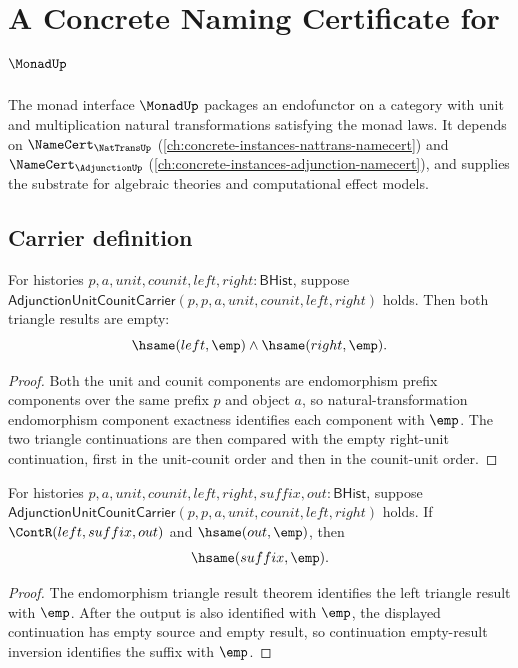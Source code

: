 \chapter{A Concrete Naming Certificate for $\MonadUp$}
\label{ch:concrete-instances-monad-namecert}

The monad interface $\MonadUp$ packages an endofunctor on a category with unit and multiplication natural transformations satisfying the monad laws. It depends on $\NameCert_{\NatTransUp}$ (\autoref{ch:concrete-instances-nattrans-namecert}) and $\NameCert_{\AdjunctionUp}$ (\autoref{ch:concrete-instances-adjunction-namecert}), and supplies the substrate for algebraic theories and computational effect models.

\section{Carrier definition}
\label{sec:monad-carrier}

\begin{theorem}
\label{thm:monad-adjunction-endomorphism-triangle-results-empty}
For histories $p,a,unit,counit,left,right:\mathsf{BHist}$, suppose
$\mathsf{AdjunctionUnitCounitCarrier}(p,p,a,unit,counit,left,right)$ holds.
Then both triangle results are empty:
$$
\hsame(left,\emp)\land\hsame(right,\emp).
$$
\end{theorem}
\begin{proof}
Both the unit and counit components are endomorphism prefix components over
the same prefix $p$ and object $a$, so natural-transformation endomorphism
component exactness identifies each component with $\emp$. The two triangle
continuations are then compared with the empty right-unit continuation, first
in the unit-counit order and then in the counit-unit order.
\end{proof}

\begin{theorem}
\label{thm:monad-adjunction-left-triangle-result-empty-suffix-empty}
For histories $p,a,unit,counit,left,right,suffix,out:\mathsf{BHist}$, suppose
$\mathsf{AdjunctionUnitCounitCarrier}(p,p,a,unit,counit,left,right)$ holds. If
$\ContR(left,suffix,out)$ and $\hsame(out,\emp)$, then
$$
\hsame(suffix,\emp).
$$
\end{theorem}
\begin{proof}
The endomorphism triangle result theorem identifies the left triangle result
with $\emp$. After the output is also identified with $\emp$, the displayed
continuation has empty source and empty result, so continuation empty-result
inversion identifies the suffix with $\emp$.
\end{proof}

